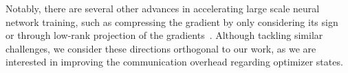 Notably, there are several other advances in accelerating large scale neural network training, such as compressing the gradient by only considering its sign~\cite{bernstein2018signsgd,DBLP:conf/nips/JiangYYZ24} or through low-rank projection of the gradients~\cite{DBLP:conf/icml/Zhao0CWAT24}. Although tackling similar challenges, we consider these directions orthogonal to our work, as we are interested in improving the communication overhead regarding optimizer states.